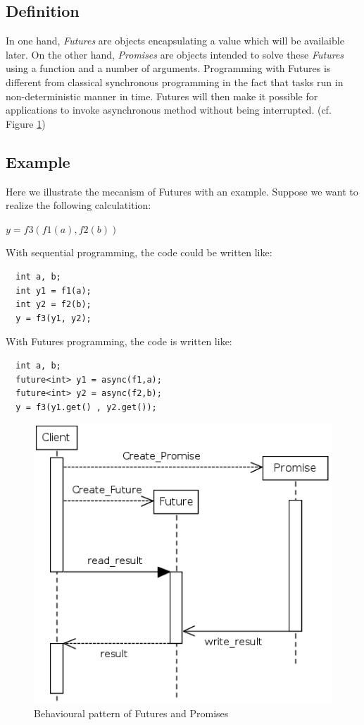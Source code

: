 \documentclass[conference]{acmsig-alternate-10pt}
\begin{document}
\subsection{Definition}
In one hand, \emph{Futures} are objects encapsulating a value which will be availaible later. On the other hand, \emph{Promises} are objects intended to solve these \emph{Futures} using a function and a number of arguments. Programming with Futures is different from classical synchronous programming in the fact that tasks run in non-deterministic manner in time. Futures will then make it possible for applications to invoke asynchronous method without being interrupted. (cf. Figure \ref{thread})

\subsection{Example}
Here we illustrate the mecanism of Futures with an example. Suppose we want to realize the following calculatition:   
\begin{center}
  $y = f3(f1(a),f2(b))$
\end{center}

With sequential programming, the code could be written like:
\begin{lstlisting}
  int a, b;
  int y1 = f1(a);
  int y2 = f2(b);
  y = f3(y1, y2);
\end{lstlisting}

With Futures programming, the code is written like:
\begin{lstlisting}
  int a, b;
  future<int> y1 = async(f1,a);
  future<int> y2 = async(f2,b);
  y = f3(y1.get() , y2.get());
\end{lstlisting}

\begin{figure}[h]
\begin{center}
\includegraphics[scale=0.5]{Images/Im1.png}
\end{center}
\caption{Behavioural pattern of Futures and Promises}
\label{thread}
\end{figure}
\end{document}
